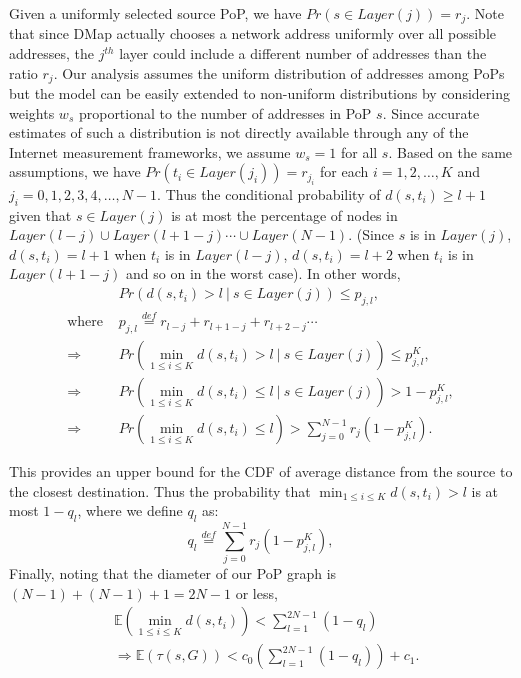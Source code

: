 Given a uniformly selected source PoP, we have $Pr(s \in Layer(j) )= r_j$. Note that since DMap actually chooses a network address uniformly over all possible addresses, the $j^{th}$ layer could include a different number of addresses than the ratio $r_j$. Our analysis assumes the uniform distribution of addresses among PoPs but the model can be easily extended to non-uniform distributions by considering weights $w_s$ proportional to the number of addresses in PoP $s$. Since accurate estimates of such a distribution is not directly available through any of the Internet measurement frameworks, we assume $w_s = 1$ for all $s$. Based on the same assumptions, we have $Pr ( t_i  \in Layer (j_i) ) = r_{j_i}$ for each $i=1, 2, \ldots , K$ and $j_i=0, 1, 2, 3, 4, \ldots, N-1$. Thus the conditional probability of $d ( s, t_i ) \ge l+1$ given that $s \in Layer(j)$ is at most the percentage of nodes in $Layer(l-j) \cup Layer(l+1 - j ) \cdots \cup Layer(N-1) $. (Since $s$ is in $Layer(j)$, $d ( s, t_i ) = l+1$ when $t_i$ is in $Layer(l-j)$, $d ( s, t_i ) = l+2$ when $t_i$ is in $Layer(l+1-j)$ and so on in the worst case). In other words,
\begin{equation}
\begin{aligned}
& Pr\left(d (s, t_i) > l  ~\big|~ s \in Layer(j) \right)  \le  p_{j,l},
\\ \textrm{where }
& p_{j, l} \stackrel{def}{=} r_{l-j} + r_{l+1 - j} + r_{l+2 - j}\cdots
\\ \Rightarrow & \nonumber
Pr \left(  \min_{1 \le i \le K} d ( s, t_i ) > l  ~\big|~ s \in Layer(j)  \right)  \le  p_{j,l}^K,
\\ \Rightarrow & \nonumber
Pr \left(  \min_{1 \le i \le K} d ( s, t_i ) \le l  ~\big|~ s \in Layer(j)  \right)  >  1 - p_{j,l}^K,
\\ \Rightarrow & \label{CDF}
Pr \left(  \min_{1 \le i \le K} d ( s, t_i ) \le  l  \right)  >
\sum_{j=0}^{N-1} r_j ( 1 - p_{j,l}^K ).
\end{aligned}
\end{equation}

This provides an upper bound for the CDF of average distance from the source to the closest destination. Thus the probability that $\min_{1 \le i \le K} d ( s, t_i ) > l$ is at most $ 1 - q_l$, where we define $q_l$ as:
\[
q_{l} \stackrel{def}{=}\sum_{j=0}^{N-1} r_j \left( 1 - p_{j,l}^K \right),
\]
Finally, noting that the diameter of our PoP graph is $(N-1)+(N-1)+1 = 2N-1$ or less,
\begin{equation}
\begin{aligned}
 & \mathbb{E}\left( \min_{1 \le i \le K} d ( s, t_i ) \right) < \sum_{l=1}^{2N-1} (1-q_l)\\
 & \Rightarrow \mathbb{E} \left(\tau(s,G)\right) < c_0 \left(\sum_{l=1}^{2N-1} (1-q_l)\right) + c_1.
\end{aligned}
\end{equation}

